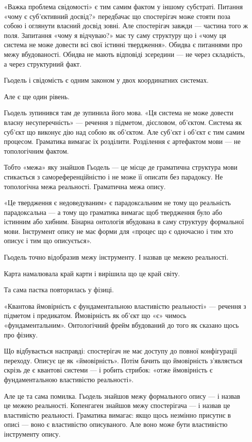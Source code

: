 \documentclass[12pt, a4paper, openany]{book}
\begin{document}
«Важка проблема свідомості» є тим самим фактом у іншому субстраті. Питання «чому є суб'єктивний досвід?» передбачає що спостерігач може стояти поза собою і оглянути власний досвід зовні. Але спостерігач завжди — частина того ж поля. Запитання «чому я відчуваю?» має ту саму структуру що і «чому ця система не може довести всі свої істинні твердження». Обидва є питаннями про межу вбудованості. Обидва не мають відповіді зсередини --- не через складність, а через структурний факт.

Гьодель і свідомість є одним законом у двох координатних системах.

Але є ще один рівень.

Гьодель зупинився там де зупинила його мова. «Ця система не може довести власну несуперечність» --- речення з підметом, дієсловом, об'єктом. Система як суб'єкт що виконує дію над собою як об'єктом. Але суб'єкт і об'єкт є тим самим процесом. Граматика вимагає їх розділити. Розділення є артефактом мови --- не топологічним фактом.

Тобто «межа» яку знайшов Гьодель --- це місце де граматична структура мови стикається з самореференційністю і не може її описати без парадоксу. Не топологічна межа реальності. Граматична межа опису.

«Це твердження є недоведуваним» є парадоксальним не тому що реальність парадоксальна --- а тому що граматика вимагає щоб твердження було або істинним або хибним. Бінарна онтологія вбудована в саму структуру формальної мови. Інструмент опису не має форми для «процес що є одночасно і тим хто описує і тим що описується».

Гьодель точно відобразив межу інструменту. І назвав це межею реальності.

Карта намалювала край карти і вирішила що це край світу.

Та сама пастка повторилась у фізиці.

«Квантова ймовірність є фундаментальною властивістю реальності» --- речення з підметом і предикатом. Ймовірність як об'єкт що «є» чимось «фундаментальним». Онтологічний фрейм вбудований до того як сказано щось про фізику.

Що відбувається насправді: спостерігач не має доступу до повної конфігурації переходу. Описує це як «ймовірність». Потім бачить що ймовірність з'являється скрізь де є квантові системи --- і робить стрибок: «отже ймовірність є фундаментальною властивістю реальності».

Але це та сама помилка. Гьодель знайшов межу формального опису --- і назвав це межею реальності. Копенгаген знайшов межу спостерігача --- і назвав це властивістю реальності. Граматика вимагає: якщо щось незмінно присутнє в описі --- воно є властивістю описуваного. Але воно може бути властивістю інструменту опису.
\end{document}
